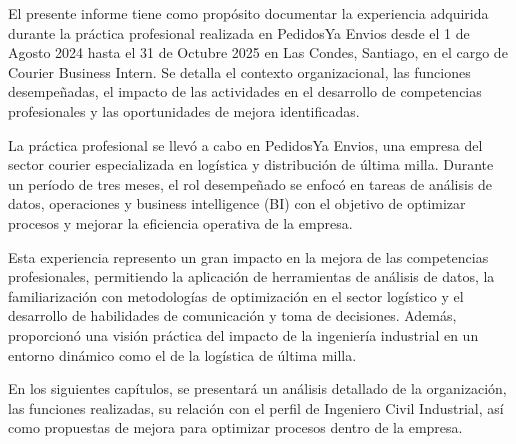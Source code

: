 El presente informe tiene como propósito documentar la experiencia adquirida durante la práctica profesional realizada en PedidosYa Envios desde el 1 de Agosto 2024 hasta el 31 de Octubre 2025 en Las Condes, Santiago, en el cargo de Courier Business Intern. Se detalla el contexto organizacional, las funciones desempeñadas, el impacto de las actividades en el desarrollo de competencias profesionales y las oportunidades de mejora identificadas.

La práctica profesional se llevó a cabo en PedidosYa Envios, una empresa del sector courier especializada en logística y distribución de última milla. Durante un período de tres meses, el rol desempeñado se enfocó en tareas de análisis de datos, operaciones y business intelligence (BI) con el objetivo de optimizar procesos y mejorar la eficiencia operativa de la empresa.

Esta experiencia represento un gran impacto en la mejora de las competencias profesionales, permitiendo la aplicación de herramientas de análisis de datos, la familiarización con metodologías de optimización en el sector logístico y el desarrollo de habilidades de comunicación y toma de decisiones. Además, proporcionó una visión práctica del impacto de la ingeniería industrial en un entorno dinámico como el de la logística de última milla.

En los siguientes capítulos, se presentará un análisis detallado de la organización, las funciones realizadas, su relación con el perfil de Ingeniero Civil Industrial, así como propuestas de mejora para optimizar procesos dentro de la empresa.
